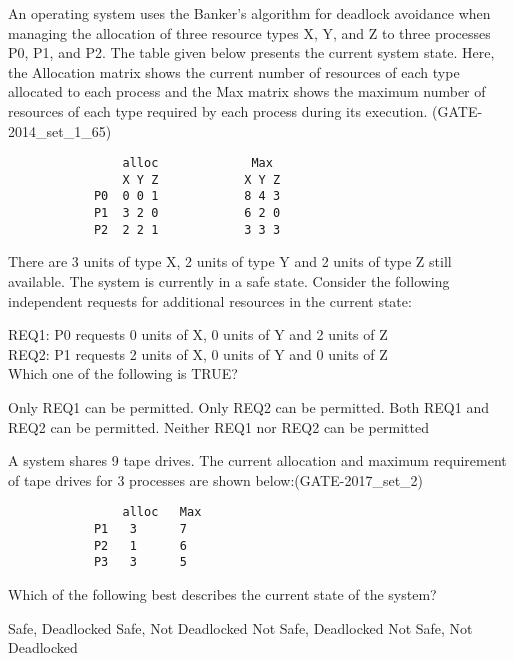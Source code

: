 \begin{questyle}

  \question  An operating system uses the Banker’s algorithm for deadlock avoidance when managing the allocation of
             three resource types X, Y, and Z to three processes P0, P1, and P2. The table given below presents the
             current system state. Here, the Allocation matrix shows the current number of resources of each type
             allocated to each process and the Max matrix shows the maximum number of resources of each type required
             by each process during its execution. (GATE-2014\_set\_1\_65)

             \begin{lstlisting}
                alloc             Max
                X Y Z            X Y Z
            P0  0 0 1            8 4 3
            P1  3 2 0            6 2 0
            P2  2 2 1            3 3 3
            \end{lstlisting}


             There are 3 units of type X, 2 units of type Y and 2 units of type Z still available. The system is
             currently in a safe state. Consider the following independent requests for additional resources in the current state:

             REQ1: P0 requests 0 units of X, 0 units of Y and 2 units of Z \\
             REQ2: P1 requests 2 units of X, 0 units of Y and 0 units of Z \\
             Which one of the following is TRUE?
  \begin{choices}
    \choice  Only REQ1 can be permitted.
    \correctchoice  Only REQ2 can be permitted.
    \choice  Both REQ1 and REQ2 can be permitted.
    \choice  Neither REQ1 nor REQ2 can be permitted
  \end{choices}

  \end{questyle}




\begin{questyle}

  \question   A system shares 9 tape drives. The current allocation and maximum requirement of tape drives for 3 processes are shown below:(GATE-2017\_set\_2)

  \begin{lstlisting}
                alloc   Max
            P1   3      7
            P2   1      6
            P3   3      5
            \end{lstlisting}

  Which of the following best describes the current state of the system?
  \begin{choices}
    \choice Safe, Deadlocked
    \correctchoice Safe, Not Deadlocked
    \choice Not Safe, Deadlocked
    \choice Not Safe, Not Deadlocked
  \end{choices}

  \end{questyle}



